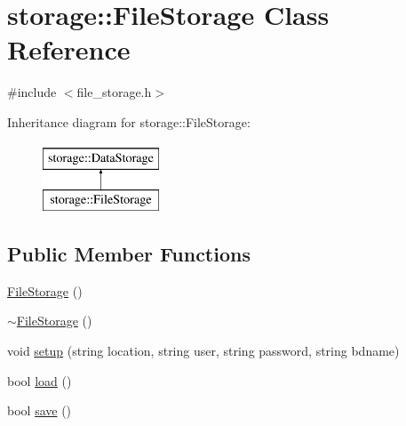 \hypertarget{classstorage_1_1FileStorage}{
\section{storage::FileStorage Class Reference}
\label{d8/da7/classstorage_1_1FileStorage}
}


{\ttfamily \#include $<$file\_\-storage.h$>$}

Inheritance diagram for storage::FileStorage:\begin{figure}[H]
\begin{center}
\leavevmode
\includegraphics[height=2.000000cm]{d8/da7/classstorage_1_1FileStorage}
\end{center}
\end{figure}
\subsection*{Public Member Functions}
\begin{DoxyCompactItemize}
\item 
\hyperlink{classstorage_1_1FileStorage_a3a88a71218e6e8cb6c7af942ac1daf47}{FileStorage} ()
\item 
\hyperlink{classstorage_1_1FileStorage_a336c41583d9b31f33988319e4397c5fc}{$\sim$FileStorage} ()
\item 
void \hyperlink{classstorage_1_1FileStorage_a74a3d23be4524c10333cba19be066c6c}{setup} (string location, string user, string password, string bdname)
\item 
bool \hyperlink{classstorage_1_1FileStorage_acec1ff977a4fb2885ca0f90336b2c296}{load} ()
\item 
bool \hyperlink{classstorage_1_1FileStorage_abc882239d83ffc2b3ddc86aad18ac83c}{save} ()
\end{DoxyCompactItemize}


